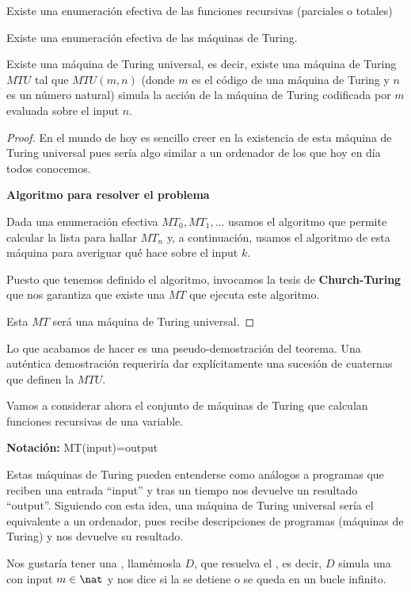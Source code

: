 \begin{theorem}
Existe una enumeración efectiva de las funciones recursivas (parciales o totales)
\end{theorem}

\begin{theorem}
Existe una enumeración efectiva de las máquinas de Turing.
\end{theorem}

\begin{theorem}
Existe una máquina de Turing universal, es decir, existe una máquina de Turing $MTU$ tal que $MTU(m,n)$ (donde $m$ es el código de una máquina de Turing y $n$ es un número natural) simula la acción de la máquina de Turing codificada por $m$ evaluada sobre el input $n$.
\end{theorem}
\begin{proof}
En el mundo de hoy es sencillo creer en la existencia de esta máquina de Turing universal pues sería algo similar a un ordenador de los que hoy en día todos conocemos.

\textbf{Algoritmo para resolver el problema}

Dada una enumeración efectiva $MT_0,MT_1,...$ usamos el algoritmo que permite calcular la lista para hallar $MT_n$ y, a continuación, usamos el algoritmo de esta máquina para averiguar qué hace sobre el input $k$.

Puesto que tenemos definido el algoritmo, invocamos la tesis de \textbf{Church-Turing} que nos garantiza que existe una $MT$ que ejecuta este algoritmo.

Esta $MT$ será una máquina de Turing universal.
\end{proof}

\obs Lo que acabamos de hacer es una pseudo-demostración del teorema. Una auténtica demostración requeriría dar explícitamente una sucesión de cuaternas que definen la $MTU$.

Vamos a considerar ahora el conjunto de máquinas de Turing que calculan funciones recursivas de una variable.

\textbf{Notación:} MT(input)=output

Estas máquinas de Turing pueden entenderse como análogos a programas que reciben una entrada ``input'' y tras un tiempo nos devuelve un resultado ``output''. Siguiendo con esta idea, una máquina de Turing universal sería el equivalente a un ordenador, pues recibe descripciones de programas (máquinas de Turing) y nos devuelve su resultado.

Nos gustaría tener una \MT, llamémosla $D$, que resuelva el , es decir, $D$ simula una \MT con input $m\in \nat$ y nos dice si la \MT se detiene o se queda en un bucle infinito.


